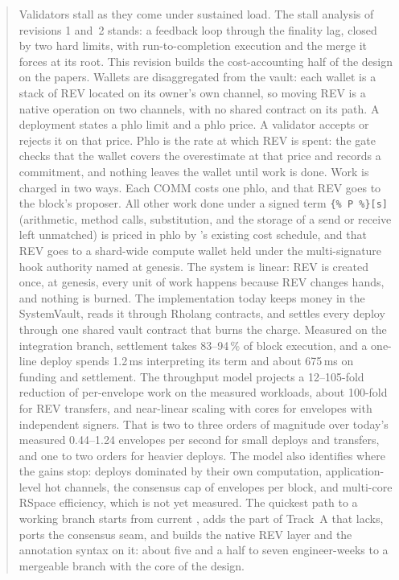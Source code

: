 \documentclass[11pt]{article}
\newcommand{\code}{\path}
\newcommand{\signed}[2]{\texttt{\{\%\,#1\,\%\}[#2]}}
\begin{document}
\begin{abstract}
\noindent Validators stall as they come under sustained load. The stall analysis of revisions 1 and~2 stands: a feedback loop through the finality lag, closed by two hard limits, with run-to-completion execution and the merge it forces at its root. This revision builds the cost-accounting half of the design on the papers. Wallets are disaggregated from the vault: each wallet is a stack of REV located on its owner's own channel, so moving REV is a native operation on two channels, with no shared contract on its path. A deployment states a phlo limit and a phlo price. A validator accepts or rejects it on that price. Phlo is the rate at which REV is spent: the gate checks that the wallet covers the overestimate at that price and records a commitment, and nothing leaves the wallet until work is done. Work is charged in two ways. Each COMM costs one phlo, and that REV goes to the block's proposer. All other work done under a signed term \signed{P}{s} (arithmetic, method calls, substitution, and the storage of a send or receive left unmatched) is priced in phlo by \code{dev}'s existing cost schedule, and that REV goes to a shard-wide compute wallet held under the multi-signature hook authority named at genesis. The system is linear: REV is created once, at genesis, every unit of work happens because REV changes hands, and nothing is burned. The implementation today keeps money in the SystemVault, reads it through Rholang contracts, and settles every deploy through one shared vault contract that burns the charge. Measured on the integration branch, settlement takes 83--94\,\% of block execution, and a one-line deploy spends 1.2\,ms interpreting its term and about 675\,ms on funding and settlement. The throughput model projects a 12--105-fold reduction of per-envelope work on the measured workloads, about 100-fold for REV transfers, and near-linear scaling with cores for envelopes with independent signers. That is two to three orders of magnitude over today's measured 0.44--1.24 envelopes per second for small deploys and transfers, and one to two orders for heavier deploys. The model also identifies where the gains stop: deploys dominated by their own computation, application-level hot channels, the consensus cap of envelopes per block, and multi-core RSpace efficiency, which is not yet measured. The quickest path to a working branch starts from current \code{dev}, adds the part of Track~A that \code{dev} lacks, ports the consensus seam, and builds the native REV layer and the annotation syntax on it: about five and a half to seven engineer-weeks to a mergeable branch with the core of the design.
\end{abstract}
\end{document}
